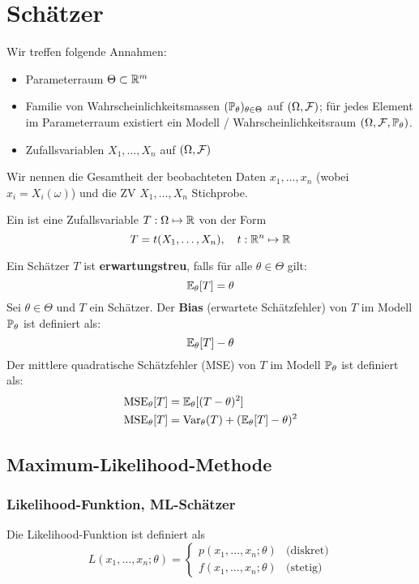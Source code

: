 \section{Schätzer}

Wir treffen folgende Annahmen:
\begin{itemize}
	\item Parameterraum \(\Theta \subset \R^m\)
	\item Familie von Wahrscheinlichkeitsmassen \((\P_\theta)_{\theta \in \Theta}\) auf \((\Omega, \F)\); 
    für jedes Element im Parameterraum existiert ein Modell / Wahrscheinlichkeitsraum $(\Omega, \F, \P_{\theta})$.
	\item Zufallsvariablen \(X_1, \ldots, X_n\) auf \((\Omega, \F)\)
\end{itemize}
Wir nennen die Gesamtheit der beobachteten Daten \(x_1, \ldots, x_n\) (wobei $x_i = X_i(\omega)$) und die ZV \(X_1, \ldots, X_n\) Stichprobe.
\begin{mainbox}{}
	Ein  ist eine Zufallsvariable \(T: \Omega \mapsto \R\) von der Form
	\[T = t(X_1, \ldots, X_n), \quad t: \R^n \mapsto \R\]
\end{mainbox}
Ein Schätzer \(T\) ist \textbf{erwartungstreu}, falls für alle \(\theta \in \Theta\) gilt:
\[\E_\theta [T] = \theta\]
Sei \(\theta \in \Theta\) und \(T\) ein Schätzer. Der \textbf{Bias} (erwartete Schätzfehler) von \(T\) im Modell \(\P_\theta\) ist definiert als:
\[\E_\theta[T]-\theta\]
Der mittlere quadratische Schätzfehler (MSE) von \(T\) im Modell \(\P_\theta\) ist definiert als:
\begin{align*}
	\text{MSE}_\theta[T] & = \E_\theta[(T-\theta)^2]                    \\
	\text{MSE}_\theta[T] & = \Var_\theta(T) + (\E_\theta[T] - \theta)^2
\end{align*}

\subsection{Maximum-Likelihood-Methode}
\subsubsection{Likelihood-Funktion, ML-Schätzer}
Die Likelihood-Funktion ist definiert als
\[L(x_1, \ldots, x_n; \theta) = \begin{cases}
		p(x_1, \ldots, x_n; \theta) & \text{(diskret)} \\
		f(x_1, \ldots, x_n; \theta) & \text{(stetig)}
	\end{cases} \]

